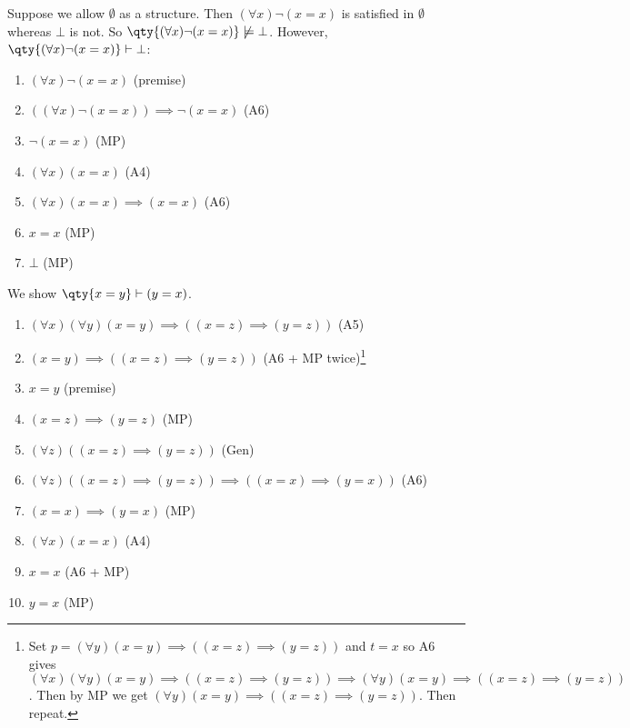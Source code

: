 \begin{remark}
    Suppose we allow $\emptyset$ as a structure.
    Then $(\forall x) \neg (x = x)$ is satisfied in $\emptyset$ whereas $\bot$ is not.
    So $\qty{(\forall x) \neg (x = x)} \not\models \bot$.
    However, $\qty{(\forall x) \neg (x = x)} \vdash \bot$:
    \begin{enumerate}
        \item $(\forall x) \neg (x = x)$ (premise)
        \item $((\forall x) \neg (x = x)) \implies \neg (x=x)$ (A6)
        \item $\neg (x = x)$ (MP)
        \item $(\forall x) (x = x)$ (A4)
        \item $(\forall x) (x = x) \implies (x = x)$ (A6)
        \item $x = x$ (MP)
        \item $\bot$ (MP)
    \end{enumerate}
\end{remark}

\begin{example}
    We show $\qty{x = y} \vdash (y = x)$.
    \begin{enumerate}
        \item $(\forall x) (\forall y) (x = y) \implies ((x = z) \implies (y = z))$ (A5)
        \item $(x = y) \implies ((x = z) \implies (y = z))$ (A6 + MP twice)\footnote{Set $p = (\forall y) (x = y) \implies ((x = z) \implies (y = z))$ and $t = x$ so A6 gives $(\forall x) (\forall y) (x = y) \implies ((x = z) \implies (y = z)) \implies (\forall y) (x = y) \implies ((x = z) \implies (y = z))$.
        Then by MP we get $(\forall y) (x = y) \implies ((x = z) \implies (y = z))$.
        Then repeat.}
        \item $x = y$ (premise)
        \item $(x = z) \implies (y = z)$ (MP)
        \item $(\forall z) ((x = z) \implies (y = z))$ (Gen)
        \item $(\forall z) ((x = z) \implies (y = z)) \implies ((x = x) \implies (y = x))$ (A6)
        \item $(x = x) \implies (y = x)$ (MP)
        \item $(\forall x) (x = x)$ (A4)
        \item $x = x$ (A6 + MP)
        \item $y = x$ (MP)
    \end{enumerate}
\end{example}

